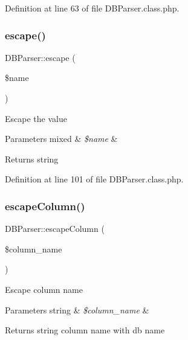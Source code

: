 Definition at line 63 of file D\+B\+Parser.\+class.\+php.

\mbox{\label{classDBParser_ac2807a8b1ef18ebf574078e60e1754c6}} 
\subsubsection{\texorpdfstring{escape()}{escape()}}
{\footnotesize\ttfamily D\+B\+Parser\+::escape (\begin{DoxyParamCaption}\item[{}]{\$name }\end{DoxyParamCaption})}

Escape the value


\begin{DoxyParams}[1]{Parameters}
mixed & {\em \$name} & \\
\hline
\end{DoxyParams}
\begin{DoxyReturn}{Returns}
string 
\end{DoxyReturn}


Definition at line 101 of file D\+B\+Parser.\+class.\+php.

\mbox{\label{classDBParser_a21799d785eb817b6df7871b895c91185}} 
\subsubsection{\texorpdfstring{escape\+Column()}{escapeColumn()}}
{\footnotesize\ttfamily D\+B\+Parser\+::escape\+Column (\begin{DoxyParamCaption}\item[{}]{\$column\+\_\+name }\end{DoxyParamCaption})}

Escape column name


\begin{DoxyParams}[1]{Parameters}
string & {\em \$column\+\_\+name} & \\
\hline
\end{DoxyParams}
\begin{DoxyReturn}{Returns}
string column name with db name 
\end{DoxyReturn}


